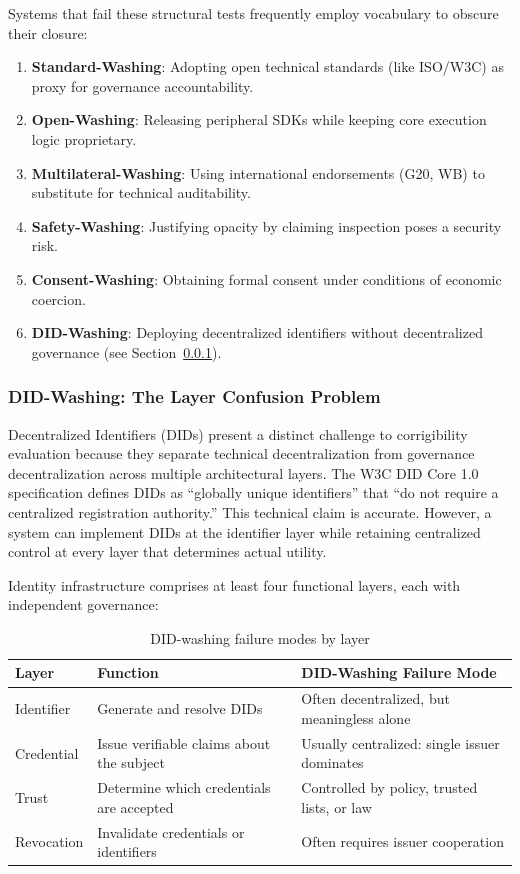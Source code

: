 \documentclass{article}
\begin{document}
Systems that fail these structural tests frequently employ vocabulary to obscure their closure:
\begin{enumerate}
    \item \textbf{Standard-Washing}: Adopting open technical standards (like ISO/W3C) as proxy for governance accountability.
    \item \textbf{Open-Washing}: Releasing peripheral SDKs while keeping core execution logic proprietary.
    \item \textbf{Multilateral-Washing}: Using international endorsements (G20, WB) to substitute for technical auditability.
    \item \textbf{Safety-Washing}: Justifying opacity by claiming inspection poses a security risk.
    \item \textbf{Consent-Washing}: Obtaining formal consent under conditions of economic coercion.
    \item \textbf{DID-Washing}: Deploying decentralized identifiers without decentralized governance (see Section~\ref{subsubsec:didwashing}).
\end{enumerate}

\subsubsection{DID-Washing: The Layer Confusion Problem}
\label{subsubsec:didwashing}

Decentralized Identifiers (DIDs) present a distinct challenge to corrigibility evaluation because they separate technical decentralization from governance decentralization across multiple architectural layers. The W3C DID Core 1.0 specification \citep{w3cdid2022} defines DIDs as ``globally unique identifiers'' that ``do not require a centralized registration authority.'' This technical claim is accurate. However, a system can implement DIDs at the identifier layer while retaining centralized control at every layer that determines actual utility.

Identity infrastructure comprises at least four functional layers, each with independent governance:

\begin{table}[htbp]
\centering
\small
\begin{tabular}{@{}llp{5cm}@{}}
\toprule
\textbf{Layer} & \textbf{Function} & \textbf{DID-Washing Failure Mode} \\
\midrule
Identifier & Generate and resolve DIDs & Often decentralized, but meaningless alone \\
Credential & Issue verifiable claims about the subject & Usually centralized: single issuer dominates \\
Trust & Determine which credentials are accepted & Controlled by policy, trusted lists, or law \\
Revocation & Invalidate credentials or identifiers & Often requires issuer cooperation \\
\bottomrule
\end{tabular}
\caption{DID-washing failure modes by layer}
\label{tab:didwashing}
\end{table}
\end{document}
